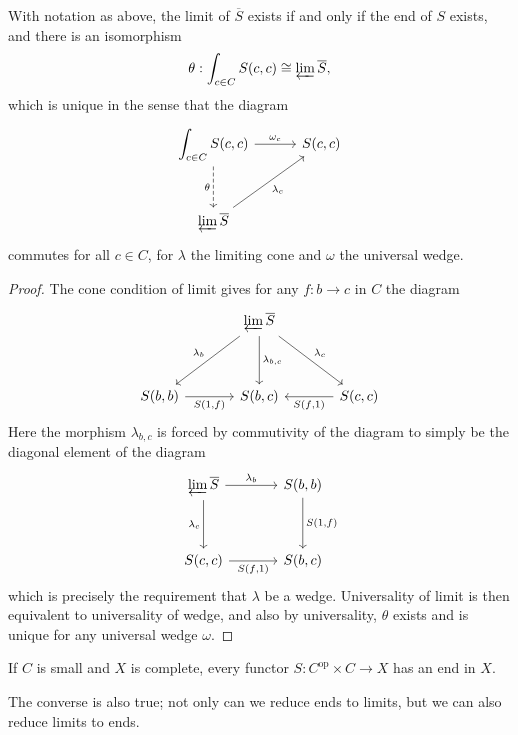 \begin{proposition}\label{prp:9.2}
	With notation as above, the limit of $\overline{S} $ exists if and only if the end of $S$ exists, and there is an isomorphism
	\[
		\theta : \int_{c\in C} S(c,c) \cong \varprojlim \overline{S} ,
	\]
	which is unique in the sense that the diagram
	\[\begin{tikzcd}[row sep = 3em, column sep = 3em]
		\displaystyle{\int_{c\in C} S(c,c)}\ar[" \omega_c ", r] \ar[" \theta "', dashed, d]  & S(c,c) \\
	\varprojlim \overline{S} \ar[" \lambda_c "', ur]  & 
	\end{tikzcd}\]
	commutes for all $c\in C$, for $\lambda$ the limiting cone and $\omega$ the universal wedge.
\end{proposition}
\begin{proof}
	The cone condition of limit gives for any $f : b \to c$ in $C$ the diagram
	\[\begin{tikzcd}[row sep = 3.5em, column sep = 3.5em]
	 & \varprojlim \overline{S} \ar[" \lambda_{c}  ", dr] \ar[" \lambda_b "', dl] \ar[" \lambda_{b,c}  ", d]  &  \\
	S(b,b)\ar[" S(1\text{,} f) "', r]  & S(b,c) & S(c,c)\ar[" S(f\text{,} 1) ", l] 
	\end{tikzcd}\]
	Here the morphism $\lambda_{b,c} $ is forced by commutivity of the diagram to simply be the diagonal element of the diagram
	\[\begin{tikzcd}[row sep = 3.5em, column sep = 3.5em]
	\varprojlim \overline{S} \ar[" \lambda_b ", r] \ar[" \lambda_c "', d]  & S(b,b)\ar[" S(1\text{,} f) ", d]  \\
	S(c,c)\ar[" S(f\text{,} 1) "', r]  & S(b,c)
	\end{tikzcd}\]
	which is precisely the requirement that $\lambda$ be a wedge. Universality of limit is then equivalent to universality of wedge, and also by universality, $\theta$ exists and is unique for any universal wedge $\omega$.
\end{proof}

\begin{corollary}\label{cor:9.1}
	If $C$ is small and $X$ is complete, every functor $S : C^{\mathrm{op} } \times C \to X$ has an end in $X$.
\end{corollary}

The converse is also true; not only can we reduce ends to limits, but we can also reduce limits to ends.

